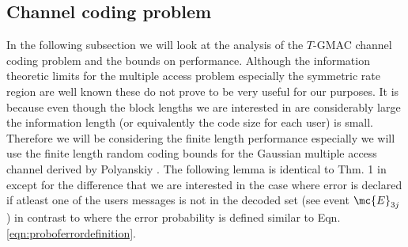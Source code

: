 \documentclass[final,onecolumn,12pt]{IEEEtran}
\begin{document}
\subsection{Channel coding problem}
In the following subsection we will look at the analysis of the $T$-GMAC channel coding problem and the bounds on performance. Although the information theoretic limits for the multiple access problem especially the symmetric rate region are well known these do not prove to be very useful for our purposes. It is because even though the block lengths we are interested in are considerably large the information length (or equivalently the code size for each user) is small. Therefore we will be considering the finite length performance especially we will use the finite length random coding bounds for the Gaussian multiple access channel derived by Polyanskiy \cite{polyanskiy17}. The following lemma is identical to Thm. 1 in \cite{polyanskiy17} except for the difference that we are interested in the case where error is declared if atleast one of the users messages is not in the decoded set (see event $\mc{E}_{3j}$) in contrast to \cite{polyanskiy17} where the error probability is defined similar to Eqn. \eqref{eqn:proboferrordefinition}.
\end{document}
